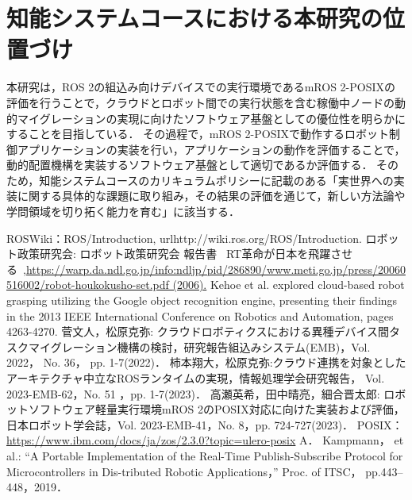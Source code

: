 \documentclass[11pt]{ujarticle}
\begin{document}
\section{知能システムコースにおける本研究の位置づけ}
本研究は，ROS 2の組込み向けデバイスでの実行環境であるmROS 2-POSIXの評価を行うことで，クラウドとロボット間での実行状態を含む稼働中ノードの動的マイグレーションの実現に向けたソフトウェア基盤としての優位性を明らかにすることを目指している．
その過程で，mROS 2-POSIXで動作するロボット制御アプリケーションの実装を行い，アプリケーションの動作を評価することで，動的配置機構を実装するソフトウェア基盤として適切であるか評価する．
そのため，知能システムコースのカリキュラムポリシーに記載のある「実世界への実装に関する具体的な課題に取り組み，その結果の評価を通じて，新しい方法論や学問領域を切り拓く能力を育む」に該当する．


\begin{thebibliography}{99}
	ROSWiki：ROS/Introduction, url{http://wiki.ros.org/ROS/Introduction.}
	ロボット政策研究会: ロボット政策研究会 報告書 ~RT革命が日本を飛躍させる~,\url{https://warp.da.ndl.go.jp/info:ndljp/pid/286890/www.meti.go.jp/press/20060516002/robot-houkokusho-set.pdf (2006).}
	Kehoe et al. explored cloud-based robot grasping utilizing the Google object recognition engine, presenting their findings in the 2013 IEEE International Conference on Robotics and Automation, pages 4263-4270.
	菅文人，松原克弥: クラウドロボティクスにおける異種デバイス間タスクマイグレーション機構の検討，研究報告組込みシステム(EMB)，Vol. 2022， No. 36， pp. 1-7(2022)．
	柿本翔大，松原克弥:クラウド連携を対象としたアーキテクチャ中立なROSランタイムの実現，情報処理学会研究報告， Vol. 2023-EMB-62，No. 51 ，pp. 1-7(2023)．
	高瀬英希，田中晴亮，細合晋太郎: ロボットソフトウェア軽量実行環境mROS 2のPOSIX対応に向けた実装および評価，日本ロボット学会誌，Vol. 2023-EMB-41，No. 8，pp. 724-727(2023)．
	 POSIX：\url{https://www.ibm.com/docs/ja/zos/2.3.0?topic=ulero-posix}
	A． Kampmann， et al.: “A Portable Implementation of the Real-Time Publish-Subscribe Protocol for Microcontrollers in Dis-tributed Robotic Applications，” Proc. of ITSC， pp.443–448，2019．
\end{thebibliography}
\end{document}
